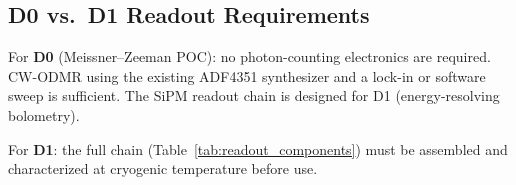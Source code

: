 \subsection{D0 vs.\ D1 Readout Requirements}

For \textbf{D0} (Meissner--Zeeman POC): no photon-counting electronics are required.
CW-ODMR using the existing ADF4351 synthesizer and a lock-in or software sweep is sufficient.
The SiPM readout chain is designed for D1 (energy-resolving bolometry).

For \textbf{D1}: the full chain (Table~\ref{tab:readout_components}) must be assembled
and characterized at cryogenic temperature before use.
